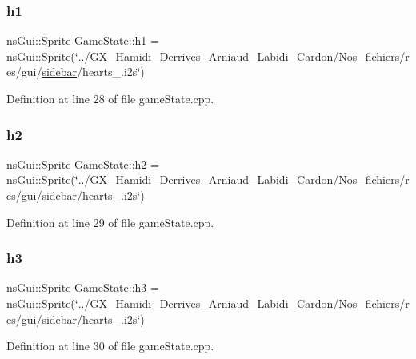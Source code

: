 \subsubsection{\texorpdfstring{h1}{h1}}
{\footnotesize\ttfamily ns\+Gui\+::\+Sprite Game\+State\+::h1 = ns\+Gui\+::\+Sprite(\char`\"{}../G\+X\+\_\+\+Hamidi\+\_\+\+Derrives\+\_\+\+Arniaud\+\_\+\+Labidi\+\_\+\+Cardon/Nos\+\_\+fichiers/res/gui/\hyperlink{class_game_state_a2e87890f9975c30f4c2bae9d6e05025f}{sidebar}/hearts\+\_.\+i2s\char`\"{})}



Definition at line 28 of file game\+State.\+cpp.

\mbox{\label{class_game_state_a826f45cb8261090fa100af6ea052213b}} 
\subsubsection{\texorpdfstring{h2}{h2}}
{\footnotesize\ttfamily ns\+Gui\+::\+Sprite Game\+State\+::h2 = ns\+Gui\+::\+Sprite(\char`\"{}../G\+X\+\_\+\+Hamidi\+\_\+\+Derrives\+\_\+\+Arniaud\+\_\+\+Labidi\+\_\+\+Cardon/Nos\+\_\+fichiers/res/gui/\hyperlink{class_game_state_a2e87890f9975c30f4c2bae9d6e05025f}{sidebar}/hearts\+\_.\+i2s\char`\"{})}



Definition at line 29 of file game\+State.\+cpp.

\mbox{\label{class_game_state_ae24f40b34e42793e90828a8e862e6864}} 
\subsubsection{\texorpdfstring{h3}{h3}}
{\footnotesize\ttfamily ns\+Gui\+::\+Sprite Game\+State\+::h3 = ns\+Gui\+::\+Sprite(\char`\"{}../G\+X\+\_\+\+Hamidi\+\_\+\+Derrives\+\_\+\+Arniaud\+\_\+\+Labidi\+\_\+\+Cardon/Nos\+\_\+fichiers/res/gui/\hyperlink{class_game_state_a2e87890f9975c30f4c2bae9d6e05025f}{sidebar}/hearts\+\_.\+i2s\char`\"{})}



Definition at line 30 of file game\+State.\+cpp.

\mbox{\label{class_game_state_ad625592fd2f6553c7e15ba61f0232ae5}} 

